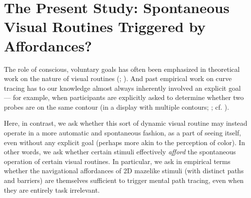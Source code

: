 \section[The Present Study]{The Present Study: Spontaneous Visual Routines Triggered by Affordances?}
The role of conscious, voluntary goals has often been emphasized in theoretical work on the nature of visual routines (\cite{ullman_visual_1984}; \cite{ullman_chapter_1996}). And past empirical work on curve tracing has to our knowledge almost always inherently involved an explicit goal --- for example, when participants are explicitly asked to determine whether two probes are on the same contour (in a display with multiple contours; \cite{jolicoeur_curve_1986}; cf. \cite{pringle_mental_1988}).\footnotemark

 Here, in contrast, we ask whether this sort of dynamic visual routine may instead operate in a more automatic and spontaneous fashion, as a part of seeing itself, even without any explicit goal (perhaps more akin to the perception of color). In other words, we ask whether certain stimuli effectively \textit{afford} the spontaneous operation of certain visual routines. In particular, we ask in empirical terms whether the navigational affordances of 2D mazelike stimuli (with distinct paths and barriers) are themselves sufficient to trigger mental path tracing, even when they are entirely task irrelevant.

